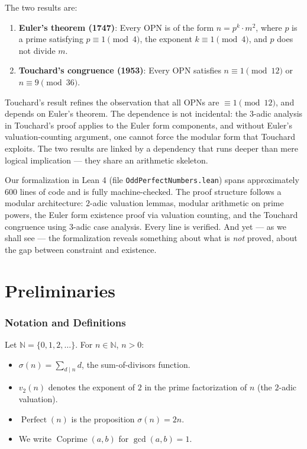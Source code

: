 \documentclass[11pt,a4paper]{article}
\begin{document}
The two results are:

\begin{enumerate}
    \item \textbf{Euler's theorem (1747)}: Every OPN is of the form $n = p^k \cdot m^2$, where $p$ is a prime satisfying $p \equiv 1 \pmod{4}$, the exponent $k \equiv 1 \pmod{4}$, and $p$ does not divide $m$.
    \item \textbf{Touchard's congruence (1953)}: Every OPN satisfies $n \equiv 1 \pmod{12}$ or $n \equiv 9 \pmod{36}$.
\end{enumerate}

Touchard's result refines the observation that all OPNs are $\equiv 1 \pmod{12}$, and depends on Euler's theorem. The dependence is not incidental: the $3$-adic analysis in Touchard's proof applies to the Euler form components, and without Euler's valuation-counting argument, one cannot force the modular form that Touchard exploits. The two results are linked by a dependency that runs deeper than mere logical implication --- they share an arithmetic skeleton.

Our formalization in Lean 4 (file \texttt{OddPerfectNumbers.lean}) spans approximately 600 lines of code and is fully machine-checked. The proof structure follows a modular architecture: $2$-adic valuation lemmas, modular arithmetic on prime powers, the Euler form existence proof via valuation counting, and the Touchard congruence using $3$-adic case analysis. Every line is verified. And yet --- as we shall see --- the formalization reveals something about what is \emph{not} proved, about the gap between constraint and existence.

\section{Preliminaries}

\subsubsection{Notation and Definitions}

Let $\mathbb{N} = \{0,1,2,\ldots\}$. For $n \in \mathbb{N}$, $n > 0$:

\begin{itemize}
    \item $\sigma(n) = \sum_{d \mid n} d$, the sum-of-divisors function.
    \item $v_2(n)$ denotes the exponent of $2$ in the prime factorization of $n$ (the $2$-adic valuation).
    \item $\operatorname{Perfect}(n)$ is the proposition $\sigma(n) = 2n$.
    \item We write $\operatorname{Coprime}(a,b)$ for $\gcd(a,b) = 1$.
\end{itemize}
\end{document}
